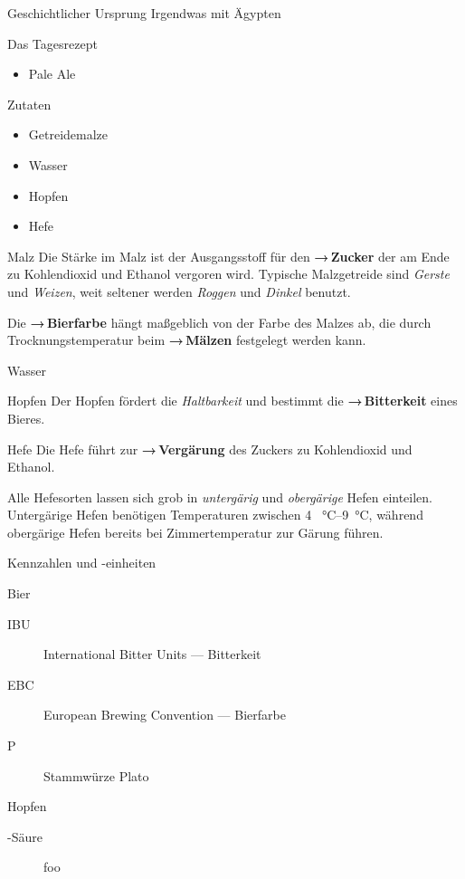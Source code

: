 \documentclass[9pt, ngerman]{beamer}
\newcommand{\forward}[1]{\textbf{→\,#1}}
\begin{document}
\begin{frame}{Geschichtlicher Ursprung}
  Irgendwas mit Ägypten
\end{frame}
\begin{frame}{Das Tagesrezept}
  \begin{itemize}
    \item Pale Ale
  \end{itemize}
\end{frame}
\begin{frame}{Zutaten}
  \begin{itemize}
    \item Getreidemalze
    \item Wasser
    \item Hopfen
    \item Hefe
  \end{itemize}
\end{frame}
\begin{frame}{Malz}
  Die Stärke im Malz ist der Ausgangsstoff für den \forward{Zucker} der am Ende
  zu Kohlendioxid und Ethanol vergoren wird. Typische Malzgetreide sind
  \emph{Gerste} und \emph{Weizen}, weit seltener werden \emph{Roggen} und
  \emph{Dinkel} benutzt.

  Die \forward{Bierfarbe} hängt maßgeblich von der Farbe des Malzes ab, die
  durch Trocknungstemperatur beim \forward{Mälzen} festgelegt werden kann.
\end{frame}
\begin{frame}{Wasser}
\end{frame}
\begin{frame}{Hopfen}
  Der Hopfen fördert die \emph{Haltbarkeit} und bestimmt die
  \forward{Bitterkeit} eines Bieres.
\end{frame}
\begin{frame}{Hefe}
  Die Hefe führt zur \forward{Vergärung} des Zuckers zu Kohlendioxid und
  Ethanol.

  Alle Hefesorten lassen sich grob in \emph{untergärig} und \emph{obergärige}
  Hefen einteilen.  Untergärige Hefen benötigen Temperaturen zwischen \SIrange{4
  }{9}{\celsius}, während obergärige Hefen bereits bei Zimmertemperatur zur
  Gärung führen.
\end{frame}
\begin{frame}{Kennzahlen und -einheiten}
  \begin{block}{Bier}
    \begin{description}
      \item[IBU] International Bitter Units --- Bitterkeit
      \item[EBC] European Brewing Convention --- Bierfarbe
      \item[\textdegree P] Stammwürze \textdegree Plato
    \end{description}
  \end{block}

  \begin{block}{Hopfen}
    \begin{description}
      \item[\textalpha-Säure]  foo
    \end{description}
  \end{block}
\end{frame}
\end{document}
